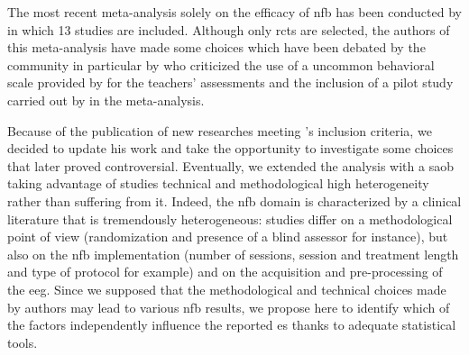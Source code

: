 

The most recent meta-analysis solely on the efficacy of \gls{nfb} has been conducted by \citet{Cortese2016} in 
which 13 studies are included. Although only \glspl{rct} are selected, the authors of 
this meta-analysis have made some choices which have been debated by the community in particular by 
\citet{Micoulaud2016} who criticized the use of a uncommon behavioral scale provided by \citet{Steiner2014}
 for the teachers' assessments and the inclusion of a pilot study carried out by \citet{Arnold2014} in the meta-analysis. 

Because of the publication of new researches meeting \citeauthor{Cortese2016}'s inclusion criteria, we decided to update his work and take 
the opportunity to investigate some choices that later proved controversial. Eventually, we extended the analysis with a \gls{saob} taking 
advantage of studies technical and methodological high heterogeneity rather than suffering from it. Indeed, the \gls{nfb} 
domain is characterized by a clinical literature that is tremendously heterogeneous: studies differ on a methodological 
point of view (randomization and presence of a blind assessor for instance), but also on the \gls{nfb} implementation (number of sessions,
session and treatment length and type of protocol for example) and on the acquisition and pre-processing of the \gls{eeg}. Since we supposed that the 
methodological and technical choices made by authors may lead to various \gls{nfb} results, we propose here to identify which of the factors 
independently influence the reported \gls{es} thanks to adequate statistical tools.








